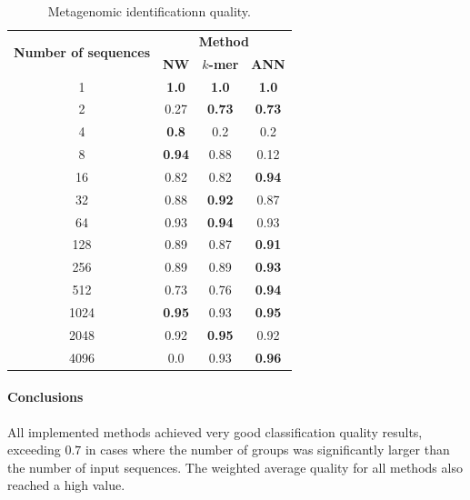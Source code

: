 \documentclass[pdflatex,sn-vancouver-num]{sn-jnl}%
\begin{document}
                \begin{table}\centering
                    \caption{Metagenomic identificationn quality.}\label{Table:Experiment:Quality}

                    \begin{tabular}{|c|c|c|c|}
                        \hline
                        \multirow{2}{*}{\textbf{Number of sequences}} & \multicolumn{3}{|c|}{\textbf{Method}} \\
                        & \textbf{NW} & \textbf{$k$-mer} & \textbf{ANN} \\ \hline \hline
                        1 & \textbf{1.0} & \textbf{1.0} & \textbf{1.0}\\ \hline
                        2 & 0.27 & \textbf{0.73} & \textbf{0.73}\\ \hline
                        4 & \textbf{0.8} & 0.2 & 0.2\\ \hline
                        8 & \textbf{0.94} & 0.88 & 0.12\\ \hline
                        16 & 0.82 & 0.82 & \textbf{0.94}\\ \hline
                        32 & 0.88 & \textbf{0.92} & 0.87\\ \hline
                        64 & 0.93 & \textbf{0.94} & 0.93\\ \hline
                        128 & 0.89 & 0.87 & \textbf{0.91}\\ \hline
                        256 & 0.89 & 0.89 & \textbf{0.93}\\ \hline
                        512 & 0.73 & 0.76 & \textbf{0.94}\\ \hline
                        1024 & \textbf{0.95} & 0.93 & \textbf{0.95}\\ \hline
                        2048 & 0.92 & \textbf{0.95} & 0.92\\ \hline
                        4096 & 0.0 & 0.93 & \textbf{0.96}\\ \hline
                    \end{tabular}
                \end{table}

                \paragraph{Conclusions}
                All implemented methods achieved very good classification quality results, exceeding $0.7$ in cases where the number of groups was significantly larger than the number of input sequences. The weighted average quality for all methods also reached a high value.
\end{document}
